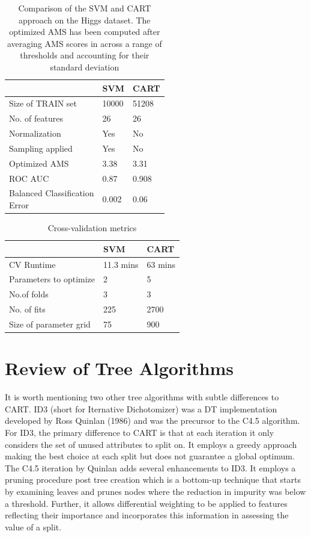 \documentclass[final,3p,times,twocolumn]{elsarticle}
\begin{document}
\begin{table}
\begin{tabular}{l|l|l}
& SVM & CART \\
\toprule
Size of TRAIN set & 10000 & 51208\\
No. of features  & 26 & 26\\
Normalization &  Yes & No\\
Sampling applied & Yes & No \\
Optimized AMS & 3.38 & 3.31\\
ROC AUC & 0.87 & 0.908 \\
\pbox{10cm}{Balanced Classification \\Error } &0.002 & 0.06
\end{tabular}
\caption{Comparison of the SVM and CART approach on the Higgs dataset. The optimized AMS has been computed after averaging AMS scores in across a range of thresholds and accounting for their standard deviation}
\label{compare_models}
\end{table}

\begin{table}
\begin{tabular}{l|l|l}
& SVM & CART \\
\toprule
CV Runtime & 11.3 mins & 63 mins\\
Parameters to optimize & 2 & 5\\
No.of folds & 3 & 3 \\
No. of fits & 225 & 2700\\
Size of parameter grid & 75 & 900 \\ 
\end{tabular}
\caption{Cross-validation metrics}
\label{cv_compare}
\end{table}

\section{Review of Tree Algorithms}

It is worth mentioning two other tree algorithms with subtle differences to CART. ID3 (short for Iternative Dichotomizer) was a DT implementation developed by Ross Quinlan (1986) and was the precursor to the C4.5 algorithm.  For ID3, the primary difference to CART is that at each iteration it only considers the set of unused attributes to split on. It employs a greedy approach making the best choice at each split but does not guarantee a global optimum. The C4.5 iteration by Quinlan adds several enhancements to ID3. It employs a pruning procedure post tree creation which is a bottom-up technique that starts by examining leaves and prunes nodes where the reduction in impurity was below a threshold. Further, it allows differential weighting to be applied to features reflecting their importance and incorporates this information in assessing the value of a split. 
\end{document}
